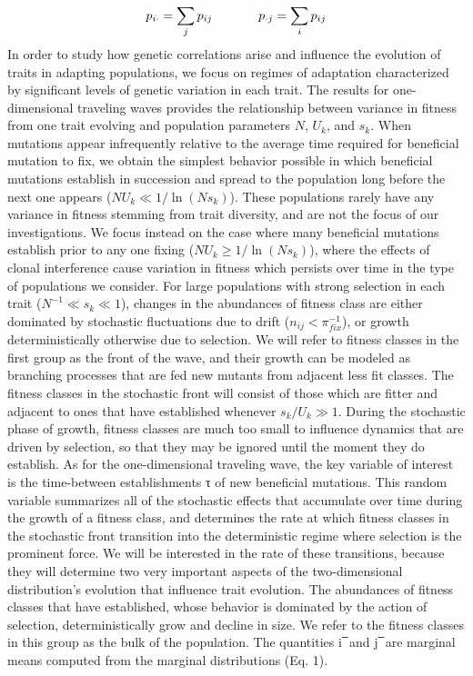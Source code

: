 \documentclass[11pt,one column]{article}
\begin{document}
\begin{multicols}{2}
\begin{equation}
p_{i \cdot }= \sum_j p_{ij} \hspace{0.5in} p_{\cdot j}= \sum_i p_{ij}
\end{equation}
In order to study how genetic correlations arise and influence the evolution of traits in adapting populations, we focus on regimes of adaptation characterized by significant levels of genetic variation in each trait. The results for one-dimensional traveling waves provides the relationship between variance in fitness from one trait evolving and population parameters $N$, $U_k$, and $s_k$. When mutations appear infrequently relative to the average time required for beneficial mutation to fix, we obtain the simplest behavior possible in which beneficial mutations establish in succession and spread to the population long before the next one appears ($N U_k \ll 1/\ln(N s_k)$). These populations rarely have any variance in fitness stemming from trait diversity, and are not the focus of our investigations. We focus instead on the case where many beneficial mutations establish prior to any one fixing ($N U_k \geq 1/\ln(N s_k)$), where the effects of clonal interference cause variation in fitness which persists over time in the type of populations we consider. For large populations with strong selection in each trait ($N^{-1}\ll s_k \ll 1$), changes in the abundances of fitness class are either dominated by stochastic fluctuations due to drift ($n_{ij}<\pi_{fix}^{-1}$), or growth deterministically otherwise due to selection. We will refer to fitness classes in the first group as the front of the wave, and their growth can be modeled as branching processes that are fed new mutants from adjacent less fit classes. The fitness classes in the stochastic front will consist of those which are fitter and adjacent to ones that have established whenever $s_k/U_k \gg 1$. During the stochastic phase of growth, fitness classes are much too small to influence dynamics that are driven by selection, so that they may be ignored until the moment they do establish. As for the one-dimensional traveling wave, the key variable of interest is the time-between establishments τ of new beneficial mutations. This random variable summarizes all of the stochastic effects that accumulate over time during the growth of a fitness class, and determines the rate at which fitness classes in the stochastic front transition into the deterministic regime where selection is the prominent force. We will be interested in the rate of these transitions, because they will determine two very important aspects of the two-dimensional distribution’s evolution that influence trait evolution. The abundances of fitness classes that have established, whose behavior is dominated by the action of selection, deterministically grow and decline in size. We refer to the fitness classes in this group as the bulk of the population. The quantities i ̅ and j ̅ are marginal means computed from the marginal distributions (Eq. 1).

\end{multicols}
\end{document}
